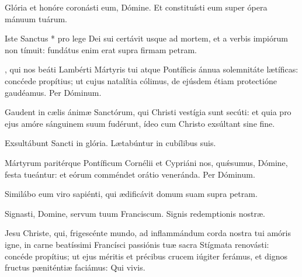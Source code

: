 \documentclass[fontsize=9pt,paper=A6,twoside,BCOR=1mm,DIV=22,headinclude]{scrarticle}
\begin{document}
\renewcommand{\section}{}
\renewcommand\A{\Ant}
\begin{multicols}{2}
	{

\V Glória et honóre coronásti eum, Dómine.
\R Et constituísti eum super ópera mánuum tuárum.

\M Iste Sanctus * pro lege Dei sui certávit usque ad mortem, et a verbis impiórum non tímuit: fundátus enim erat supra firmam petram.

, qui nos beáti Lambérti Mártyris tui atque Pontíficis ánnua solemnitáte lætíficas: concćede propítius; ut cujus natalítia cólimus, de ejúsdem étiam protectióne gaudéamus. Per Dóminum.


\Ant Gaudent in cælis ánimæ Sanctórum, qui Christi vestígia sunt secúti: et quia pro ejus amóre sánguinem suum fudérunt, ídeo cum Christo exsúltant sine fine.

\V Exsultábunt Sancti in glória.
\R Lætabúntur in cubílibus suis.

 Mártyrum paritérque Pontíficum Cornélii et Cypriáni nos, quǽsumus, Dómine, festa tueántur: et eórum comméndet orátio veneránda. Per Dóminum.


\Ant Similábo eum viro sapiénti, qui ædificávit domum suam supra petram.

\V Signasti, Domine, servum tuum Franciscum.
\R Signis redemptionis nostræ.

}

 Jesu Christe, qui, frigescénte mundo, ad inflammándum corda nostra tui amóris igne, in carne beatíssimi Francísci passiónis tuæ sacra Stígmata renovásti: concéde propítius; ut ejus méritis et précibus crucem iúgiter ferámus, et dignos fructus pæniténtiæ faciámus: Qui vivis.



\end{multicols}
\end{document}
